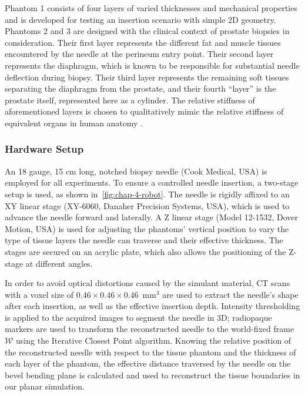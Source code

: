 Phantom 1 consists of four layers of varied thicknesses and mechanical properties and is developed for testing an insertion scenario with simple 2D geometry. Phantoms 2 and 3 are designed with the clinical context of prostate biopsies in consideration. Their first layer represents the different fat and muscle tissues encountered by the needle at the perineum entry point. Their second layer represents the diaphragm, which is known to be responsible for substantial needle deflection during biopsy. Their third layer represents the remaining soft tissues separating the diaphragm from the prostate, and their fourth ``layer'' is the prostate itself, represented here as a cylinder. The relative stiffness of aforementioned layers is chosen to qualitatively mimic the relative stiffness of equivalent organs in human anatomy \parencite{boubakerFiniteElementSimulation2009}.

\subsubsection{Hardware Setup}
\label{sec:chap-4-hardware-setup}

An 18 gauge, 15 cm long, notched biopsy needle (Cook Medical, USA) is employed for all experiments. To ensure a controlled needle insertion, a two-stage setup is used, as shown in~\cref{fig:chap-4-robot}. The needle is rigidly affixed to an XY linear stage (XY-6060, Danaher Precision Systems, USA), which is used to advance the needle forward and laterally. A Z linear stage (Model 12-1532, Dover Motion, USA) is used for adjusting the phantoms' vertical position to vary the type of tissue layers the needle can traverse and their effective thickness. The stages are secured on an acrylic plate, which also allows the positioning of the Z-stage at different angles. 

In order to avoid optical distortions caused by the simulant material, CT scans with a voxel size of $0.46\times0.46\times0.46$~mm$^{3}$ are used to extract the needle's shape after each insertion, as well as the effective insertion depth. Intensity thresholding is applied to the acquired images to segment the needle in 3D; radiopaque markers are used to transform the reconstructed needle to the world-fixed frame $\mathcal{W}$ using the Iterative Closest Point algorithm. Knowing the relative position of the reconstructed needle with respect to the tissue phantom and the thickness of each layer of the phantom, the effective distance traversed by the needle on the bevel bending plane is calculated and used to reconstruct the tissue boundaries in our planar simulation.

